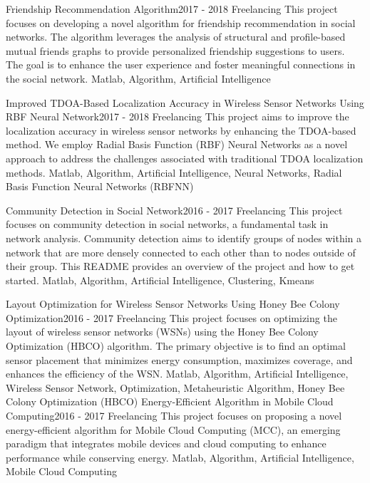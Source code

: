 
\begin{projects}
	\project
	{Friendship Recommendation Algorithm}{2017 - 2018}
	{ {Freelancing} }
	{This project focuses on developing a novel algorithm for friendship recommendation in social networks. The algorithm leverages the analysis of structural and profile-based mutual friends graphs to provide personalized friendship suggestions to users. The goal is to enhance the user experience and foster meaningful connections in the social network.}
	{Matlab, Algorithm, Artificial Intelligence}
				
	\project
	{Improved TDOA-Based Localization Accuracy in Wireless Sensor Networks Using RBF Neural Network}{2017 - 2018}
	{ {Freelancing} }
	{This project aims to improve the localization accuracy in wireless sensor networks by enhancing the TDOA-based method. We employ Radial Basis Function (RBF) Neural Networks as a novel approach to address the challenges associated with traditional TDOA localization methods.}
	{Matlab, Algorithm, Artificial Intelligence, Neural Networks, Radial Basis Function Neural Networks (RBFNN)}

	\project
	{Community Detection in Social Network}{2016 - 2017}
	{ {Freelancing} }
	{This project focuses on community detection in social networks, a fundamental task in network analysis. Community detection aims to identify groups of nodes within a network that are more densely connected to each other than to nodes outside of their group. This README provides an overview of the project and how to get started.}
	{Matlab, Algorithm, Artificial Intelligence, Clustering, Kmeans}

	\project
	{Layout Optimization for Wireless Sensor Networks Using Honey Bee Colony Optimization}{2016 - 2017}
	{ {Freelancing} }
	{This project focuses on optimizing the layout of wireless sensor networks (WSNs) using the Honey Bee Colony Optimization (HBCO) algorithm. The primary objective is to find an optimal sensor placement that minimizes energy consumption, maximizes coverage, and enhances the efficiency of the WSN.}
	{Matlab, Algorithm, Artificial Intelligence, Wireless Sensor Network, Optimization, Metaheuristic Algorithm, Honey Bee Colony Optimization (HBCO)}
	\newpage
	\project
	{Energy-Efficient Algorithm in Mobile Cloud Computing}{2016 - 2017}
	{ {Freelancing} }
	{This project focuses on proposing a novel energy-efficient algorithm for Mobile Cloud Computing (MCC), an emerging paradigm that integrates mobile devices and cloud computing to enhance performance while conserving energy.}
	{Matlab, Algorithm, Artificial Intelligence, Mobile Cloud Computing}
	

\end{projects}
